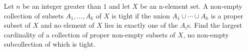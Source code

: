 Let $n$ be an integer greater than $1$ and let $X$ be an n-element set. A non-empty collection of subsets $A_1, ..., A_k$ of $X$ is tight if the union $A_1 \cup \cdots  \cup A_k$ is a proper subset of $X$ and no element of $X$ lies in exactly one of the $A_i$s. Find the largest cardinality of a collection of proper non-empty subsets of $X$, no non-empty subcollection of which is tight.

